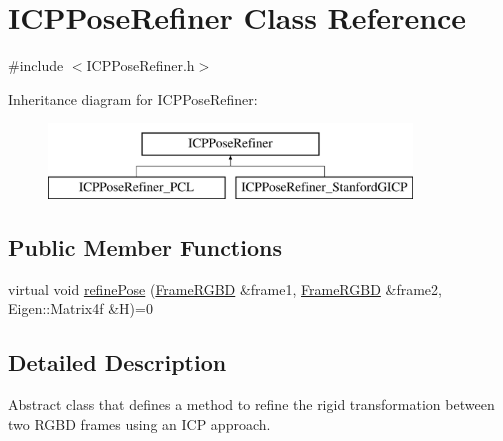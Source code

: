 \hypertarget{class_i_c_p_pose_refiner}{
\section{ICPPoseRefiner Class Reference}
\label{class_i_c_p_pose_refiner}
}


{\ttfamily \#include $<$ICPPoseRefiner.h$>$}

Inheritance diagram for ICPPoseRefiner:\begin{figure}[H]
\begin{center}
\leavevmode
\includegraphics[height=2.000000cm]{class_i_c_p_pose_refiner}
\end{center}
\end{figure}
\subsection*{Public Member Functions}
\begin{DoxyCompactItemize}
\item 
virtual void \hyperlink{class_i_c_p_pose_refiner_ad359ab15346aa343a51bd8ae71cd3ea1}{refinePose} (\hyperlink{class_frame_r_g_b_d}{FrameRGBD} \&frame1, \hyperlink{class_frame_r_g_b_d}{FrameRGBD} \&frame2, Eigen::Matrix4f \&H)=0
\end{DoxyCompactItemize}


\subsection{Detailed Description}
Abstract class that defines a method to refine the rigid transformation between two RGBD frames using an ICP approach. 

